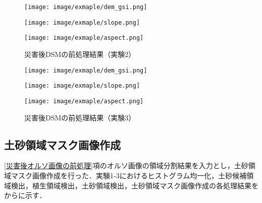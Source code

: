       \begin{figure}[t]
        \begin{minipage}[c]{0.329\hsize}
          \centering
          \texttt{[image: image/exmaple/dem\_gsi.png]}
        \end{minipage}
        \begin{minipage}[c]{0.329\hsize}
          \centering
          \texttt{[image: image/exmaple/slope.png]}
        \end{minipage}
        \begin{minipage}[c]{0.329\hsize}
          \centering
          \texttt{[image: image/exmaple/aspect.png]}
        \end{minipage}
        \caption{災害後DSMの前処理結果（実験2）}
      \end{figure}

      \begin{figure}[t]
        \begin{minipage}[c]{0.329\hsize}
          \centering
          \texttt{[image: image/exmaple/dem\_gsi.png]}
        \end{minipage}
        \begin{minipage}[c]{0.329\hsize}
          \centering
          \texttt{[image: image/exmaple/slope.png]}
        \end{minipage}
        \begin{minipage}[c]{0.329\hsize}
          \centering
          \texttt{[image: image/exmaple/aspect.png]}
        \end{minipage}
        \caption{災害後DSMの前処理結果（実験3）}
        \label{災害後DSMの前処理結果（実験3）}
      \end{figure}
    

    \subsection{土砂領域マスク画像作成}
      \label{土砂領域マスク画像作成（実験）}
      \ref{災害後オルソ画像の前処理}項のオルソ画像の領域分割結果を入力とし，土砂領域マスク画像作成を行った．実験1-3におけるヒストグラム均一化，土砂候補領域検出，植生領域検出，土砂領域検出，土砂領域マスク画像作成の各処理結果をからに示す．

